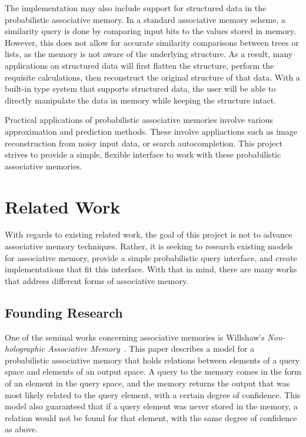 \documentclass{sig-alternate}
\begin{document}

The implementation may also include support for structured data in the probabilistic associative memory.
In a standard associative memory scheme, a similarity query is done by comparing input bits
to the values stored in memory. However, this does not allow for accurate similarity comparisons
between trees or lists, as the memory is not aware of the underlying structure. As a result,
many applications on structured data will first flatten the structure, perform the requisite 
calculations, then reconstruct the original structure of that data. With a built-in type system
that supports structured data, the user will be able to directly manipulate the data in memory 
while keeping the structure intact.

Practical applications of probabilistic associative memories involve various approximation and prediction methods.
These involve appliactions such as image reconstruction from noisy input data, or search autocompletion.
This project strives to provide a simple, flexible interface to work with these probabilistic associative memories.



\section{Related Work}
\label{sec:related_work}

With regards to existing related work, the goal of this project is not to advance associative memory techniques.
Rather, it is seeking to research existing models for associative memory, provide a simple probabilistic query interface, and create 
implementations that fit this interface. With that in mind, there are many works that address different forms of associative memory. 

\subsection{Founding Research}
\label{subsec:founding}

One of the seminal works concerning associative memories is Willshaw's \textit{Non-holographic
Associative Memory}~\cite{holographic}. This paper describes a model for a probabilistic associative memory
that holds relations between elements of a query space and elements of an output space. A query
to the memory comes in the form of an element in the query space, and the memory returns the
output that was most likely related to the query element, with a certain degree of confidence.
This model also guaranteed that if a query element was never stored in the memory, a relation
would not be found for that element, with the same degree of confidence as above.
\end{document}
